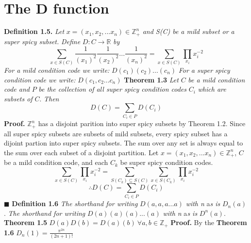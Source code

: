 \documentclass[12pt]{article}
\begin{document}
\section{The D function}
\textbf{Definition 1.5.} \textit{Let } \(x = (x_1,x_2,...x_n)\in \mathbb{Z}_+^n\)\textit{ and S(C) be a mild subset or a super spicy subset.}
\newline
\textit{Define }\(D:C\rightarrow \mathbb{R}\) \textit{ by }
\[\sum_{x \in S(C)}\frac{1}{(x_1)^2}\frac{1}{(x_2)^2}...\frac{1}{(x_n)^2}=\sum_{x \in S(C)}\prod_{x_i}x_i^{-2}\]
\textit{For a mild condition code we write: }\(D(c_1)(c_2)...(c_n)\)
\newline
\textit{For a super spicy condition code we write: }\(D(c_1,c_2...c_n)\)
\newline \newline
\textbf{Theorem 1.3} \textit{Let } \(C\) \textit{ be a mild condition code and } \(P\) \textit{ be the collection of all super spicy condition codes } \(C_i\) \textit{ which are subsets of }\(C\).\textit{ Then } \[D(C)=\sum_{C_i\in P}D(C_i)\]
\textbf{Proof. }
\newline
\(\mathbb{Z}_+^n\) has a disjoint parition into super spicy subsets by Theorem 1.2. \newline
Since all super spicy subsets are subsets of mild subsets, every spicy subset has a dijoint partion into super spicy subsets.
\newline
The sum over any set is always equal to the sum over each subset of a disjoint partition.
\newline
Let \(x = (x_1,x_2,...x_n)\in \mathbb{Z}_+^n\), \(C\) be a mild condition code, and each \(C_k\) be super spicy condition codes.
\[\sum_{x \in S(C)}\prod_{x_i}x_i^{-2}=\sum_{S(C_k)\subseteq S(C)}\sum_{x \in S(C_k)}\prod_{x_i}x_i^{-2}\]
\[\therefore D(C)=\sum_{C_i\in P}D(C_i)\]
\(\blacksquare\) \newline
\textbf{Definition 1.6} \newline
\textit{The shorthand for writing } \(D(a,a,a...a)\) \textit{with n} a\textit{s is } \(D_n(a)\).
\newline
\textit{The shorthand for writing } \(D(a)(a)(a)...(a)\) \textit{with n} a\textit{s is } \(D^n(a)\).
\newline
\newline
\textbf{Theorem 1.5} \(D(a)D(b) = D(a)(b)\ \forall a,b\in \mathbb{Z}_+\)
\newline
\textbf{Proof.} By the
\newline
\newline
\textbf{Theorem 1.6} \(D_n(1)=\frac{\pi^{2n}}{(2n+1)!}\)
\end{document}
